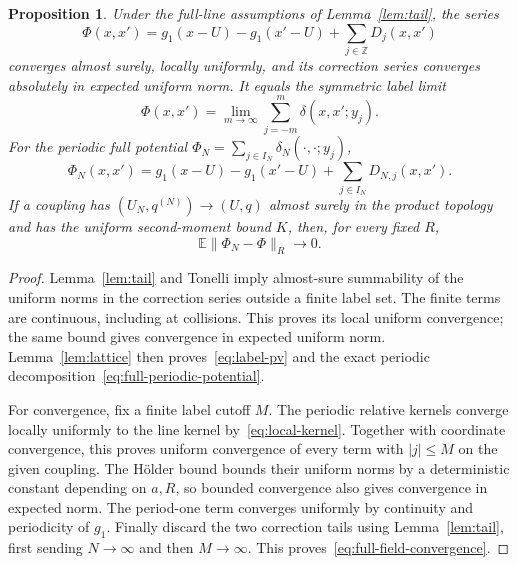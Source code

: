 \documentclass[11pt]{article}
\newtheorem{proposition}[theorem]{Proposition}
\theoremstyle{remark}\newtheorem{remark}[theorem]{Remark}
\newcommand{\E}{\mathbb E}
\newcommand{\Z}{\mathbb Z}
\begin{document}
\begin{proposition}\label{prop:full-potential}
Under the full-line assumptions of Lemma~\ref{lem:tail}, the series
\begin{equation}\label{eq:full-line-potential}
 \Phi(x,x')=g_1(x-U)-g_1(x'-U)+\sum_{j\in\Z}D_j(x,x')
\end{equation}
converges almost surely, locally uniformly, and its correction
series converges absolutely in expected uniform norm. It equals
the symmetric label limit
\begin{equation}\label{eq:label-pv}
 \Phi(x,x')=\lim_{m\to\infty}\sum_{j=-m}^m\delta(x,x';y_j).
\end{equation}
For the periodic full potential
$\Phi_N=\sum_{j\in I_N}\delta_N(\cdot,\cdot;y_j)$,
\begin{equation}\label{eq:full-periodic-potential}
 \Phi_N(x,x')=g_1(x-U)-g_1(x'-U)
                    +\sum_{j\in I_N}D_{N,j}(x,x').
\end{equation}
If a coupling has $(U_N,q^{(N)})\to(U,q)$ almost surely in
the product topology and has the uniform second-moment bound
$K$, then, for every fixed $R$,
\begin{equation}\label{eq:full-field-convergence}
 \E\|\Phi_N-\Phi\|_R\longrightarrow0.
\end{equation}
\end{proposition}
\begin{proof}
Lemma~\ref{lem:tail} and Tonelli imply almost-sure summability
of the uniform norms in the correction series outside a finite
label set. The finite terms are continuous, including at
collisions. This proves its local uniform convergence; the same
bound gives convergence in expected uniform norm.
Lemma~\ref{lem:lattice} then proves~\eqref{eq:label-pv} and
the exact periodic decomposition~\eqref{eq:full-periodic-potential}.

For convergence, fix a finite label cutoff $M$. The periodic
relative kernels converge locally uniformly to the line kernel
by~\eqref{eq:local-kernel}. Together with coordinate convergence,
this proves uniform convergence of every term with $|j|\le M$
on the given coupling. The H\"older bound bounds their uniform
norms by a deterministic constant depending on $a,R$, so bounded
convergence also gives convergence in expected norm. The
period-one term converges uniformly by continuity and periodicity
of $g_1$. Finally discard the two correction tails using
Lemma~\ref{lem:tail}, first sending $N\to\infty$ and then
$M\to\infty$. This proves~\eqref{eq:full-field-convergence}.
\end{proof}
\end{document}
